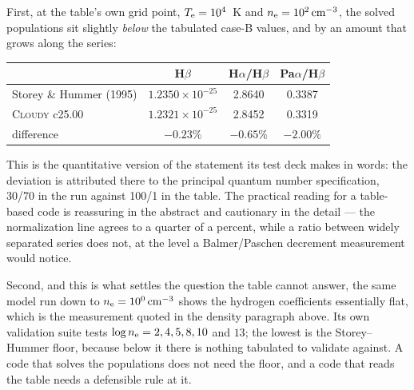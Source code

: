 \documentclass[english,a4paper]{my_memo}
\newcommand{\Cloudy}{\textsc{Cloudy}}
\newcommand{\Te}{T_{\rm e}}
\newcommand{\nelec}{n_{\rm e}}
\begin{document}
First, at the table's own grid point, $\Te = 10^4$~K and
$\nelec = 10^2\,\mathrm{cm^{-3}}$, the solved populations sit slightly
\emph{below} the tabulated case-B values, and by an amount that grows along the
series:
\begin{center}
\begin{tabular}{lccc}
\toprule
& H$\beta$ & H$\alpha$/H$\beta$ & Pa$\alpha$/H$\beta$ \\
\midrule
Storey \& Hummer (1995) & $1.2350\times10^{-25}$ & 2.8640 & 0.3387 \\
\Cloudy{} c25.00        & $1.2321\times10^{-25}$ & 2.8452 & 0.3319 \\
difference              & $-0.23\%$ & $-0.65\%$ & $-2.00\%$ \\
\bottomrule
\end{tabular}
\end{center}
This is the quantitative version of the statement its test deck makes in words:
the deviation is attributed there to the principal quantum number
specification, 30/70 in the run against 100/1 in the table.  The practical
reading for a table-based code is reassuring in the abstract and cautionary in
the detail --- the normalization line agrees to a quarter of a percent, while a
ratio between widely separated series does not, at the level a Balmer/Paschen
decrement measurement would notice.

Second, and this is what settles the question the table cannot answer, the same
model run down to $\nelec = 10^0\,\mathrm{cm^{-3}}$ shows the hydrogen
coefficients essentially flat, which is the measurement quoted in the
density paragraph above.  Its own validation suite tests
$\log \nelec = 2, 4, 5, 8, 10$ and $13$; the lowest is the Storey--Hummer floor,
because below it there is nothing tabulated to validate against.  A code that
solves the populations does not need the floor, and a code that reads the table
needs a defensible rule at it.
\end{document}
